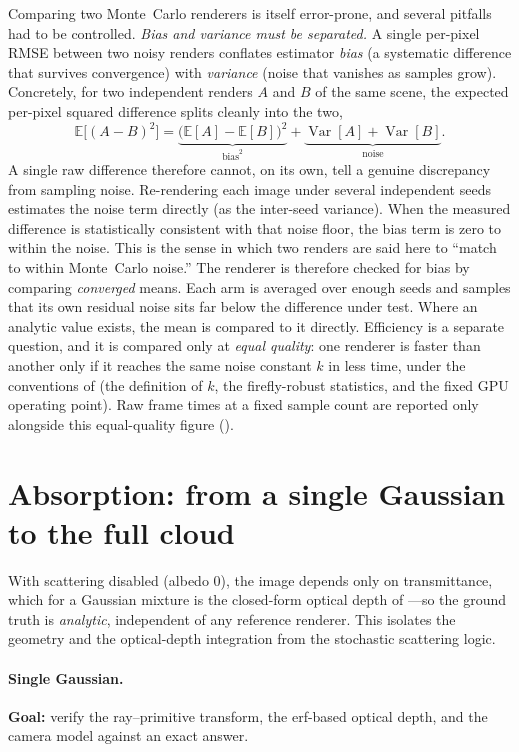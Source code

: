 Comparing two Monte~Carlo renderers is itself error-prone, and several pitfalls had to be controlled.
\emph{Bias and variance must be separated.} A single per-pixel RMSE between two noisy renders conflates
estimator \emph{bias} (a systematic difference that survives convergence) with \emph{variance} (noise
that vanishes as samples grow). Concretely, for two independent renders $A$ and $B$ of the same scene,
the expected per-pixel squared difference splits cleanly into the two,
\[
  \mathbb{E}\big[(A-B)^2\big]
  = \underbrace{\big(\mathbb{E}[A]-\mathbb{E}[B]\big)^2}_{\text{bias}^2}
  + \underbrace{\operatorname{Var}[A]+\operatorname{Var}[B]}_{\text{noise}}.
\]
A single raw difference therefore cannot, on its own, tell a genuine discrepancy from sampling noise.
Re-rendering each image under several independent seeds estimates the noise term directly (as the
inter-seed variance). When the measured difference is statistically consistent with that noise floor,
the bias term is zero to within the noise. This is the sense in which two renders are said
here to
``match to within Monte~Carlo noise.'' The renderer is therefore checked for bias by comparing \emph{converged} means. Each arm is
averaged over enough seeds and samples that its own residual noise sits far below the
difference under test. Where an analytic value exists, the mean is compared to it directly.
Efficiency is a separate question, and it is compared only at \emph{equal quality}: one
renderer is faster than another only if it reaches the same noise constant $k$ in less time,
under the conventions of  (the definition of $k$, the firefly-robust
statistics, and the fixed GPU operating point). Raw frame times at a fixed sample count are
reported only alongside this equal-quality figure ().

\section{Absorption: from a single Gaussian to the full cloud}
\label{sec:absorption-ladder}

With scattering disabled (albedo $0$), the image depends only on transmittance, which for a Gaussian
mixture is the closed-form optical depth of ---so the ground truth is
\emph{analytic}, independent of any reference renderer. This isolates the geometry and the optical-depth
integration from the stochastic scattering logic.

\paragraph{Single Gaussian.} \textbf{Goal:} verify the ray--primitive transform, the erf-based
optical depth, and the camera model against an exact answer.

